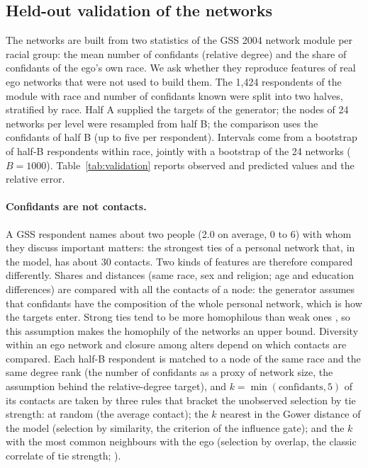 \subsection{Held-out validation of the networks}
\label{sec:validation}

The networks are built from two statistics of the GSS 2004 network module per racial
group: the mean number of confidants (relative degree) and the share of confidants of
the ego's own race. We ask whether they reproduce features of real ego networks that
were not used to build them. The 1{,}424 respondents of the module with race and number
of confidants known were split into two halves, stratified by race. Half A supplied the
targets of the generator; the nodes of 24 networks per level were resampled from half B;
the comparison uses the confidants of half B (up to five per respondent). Intervals come
from a bootstrap of half-B respondents within race, jointly with a bootstrap of the 24
networks ($B = 1000$). Table~\ref{tab:validation} reports observed and predicted values
and the relative error.

\paragraph{Confidants are not contacts.} A GSS respondent names about two people
(2.0 on average, 0 to 6) with whom they discuss important matters: the strongest ties of
a personal network that, in the model, has about 30 contacts. Two kinds of features are
therefore compared differently. Shares and distances (same race, sex and religion; age
and education differences) are compared with all the contacts of a node: the generator
assumes that confidants have the composition of the whole personal network, which is how
the targets enter. Strong ties tend to be more homophilous than weak ones
\citep{mcpherson2001}, so this assumption makes the homophily of the networks an upper
bound. Diversity within an ego network and closure among alters depend on which
contacts are compared. Each half-B respondent is matched to a node of the same race and
the same degree rank (the number of confidants as a proxy of network size, the
assumption behind the relative-degree target), and $k = \min(\text{confidants}, 5)$ of
its contacts are taken by three rules that bracket the unobserved selection by tie
strength: at random (the average contact); the $k$ nearest in the Gower distance of the
model (selection by similarity, the criterion of the influence gate); and the $k$ with
the most common neighbours with the ego (selection by overlap, the classic correlate of
tie strength; \citealp{granovetter1973}).

